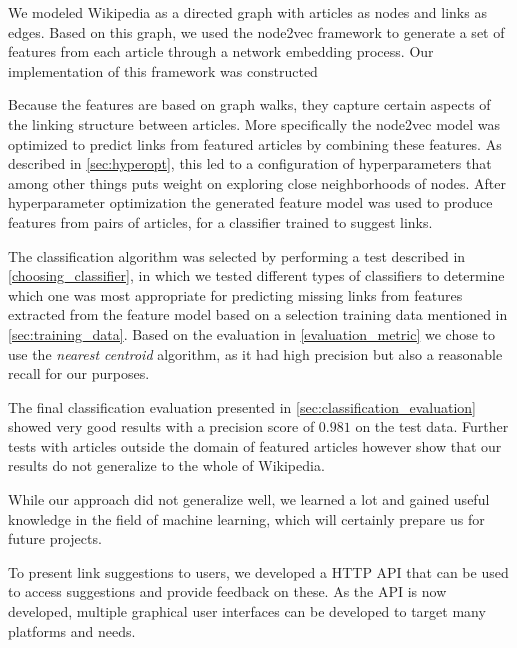 We modeled Wikipedia as a directed graph with articles as nodes and links as edges. Based on this graph, we used the node2vec framework to generate a set of features from each article through a network embedding process. Our implementation of this framework was constructed 




Because the features are based on graph walks, they capture certain aspects of the linking structure between articles. More specifically the node2vec model was optimized to predict links from featured articles by combining these features. As described in \cref{sec:hyperopt}, this led to a configuration of hyperparameters that among other things puts weight on exploring close neighborhoods of nodes. After hyperparameter optimization the generated feature model was used to produce features from pairs of articles, for a classifier trained to suggest links.

The classification algorithm was selected by performing a test described in \cref{choosing_classifier}, in which we tested different types of classifiers to determine which one was most appropriate for predicting missing links from features extracted from the feature model based on a selection training data mentioned in \cref{sec:training_data}. Based on the evaluation in \cref{evaluation_metric} we chose to use the \emph{nearest centroid} algorithm, as it had high precision but also a reasonable recall for our purposes. 

The final classification evaluation presented in \cref{sec:classification_evaluation} showed very good results with a precision score of $0.981$ on the test data. Further tests with articles outside the domain of featured articles however show that our results do not generalize to the whole of Wikipedia. 

While our approach did not generalize well, we learned a lot and gained useful knowledge in the field of machine learning, which will certainly prepare us for future projects.

To present link suggestions to users, we developed a HTTP API that can be used to access suggestions and provide feedback on these. As the API is now developed, multiple graphical user interfaces can be developed to target many platforms and needs.